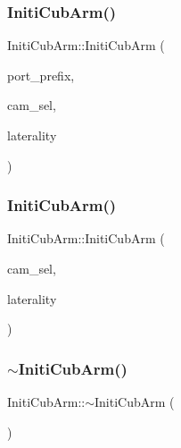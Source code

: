 \subsubsection{\texorpdfstring{Initi\+Cub\+Arm()}{InitiCubArm()}\hspace{0.1cm}{\footnotesize\ttfamily [1/2]}}
{\footnotesize\ttfamily Initi\+Cub\+Arm\+::\+Initi\+Cub\+Arm (\begin{DoxyParamCaption}\item[{const yarp\+::os\+::\+Const\+String \&}]{port\+\_\+prefix,  }\item[{const yarp\+::os\+::\+Const\+String \&}]{cam\+\_\+sel,  }\item[{const yarp\+::os\+::\+Const\+String \&}]{laterality }\end{DoxyParamCaption})\hspace{0.3cm}{\ttfamily [noexcept]}}

\mbox{\label{classInitiCubArm_affa3e5d97a2f24f3e3fd2030a0dd5dbc}} 
\subsubsection{\texorpdfstring{Initi\+Cub\+Arm()}{InitiCubArm()}\hspace{0.1cm}{\footnotesize\ttfamily [2/2]}}
{\footnotesize\ttfamily Initi\+Cub\+Arm\+::\+Initi\+Cub\+Arm (\begin{DoxyParamCaption}\item[{const yarp\+::os\+::\+Const\+String \&}]{cam\+\_\+sel,  }\item[{const yarp\+::os\+::\+Const\+String \&}]{laterality }\end{DoxyParamCaption})\hspace{0.3cm}{\ttfamily [noexcept]}}

\mbox{\label{classInitiCubArm_a337d96e7aecbd9235b3734c2aa317429}} 
\subsubsection{\texorpdfstring{$\sim$\+Initi\+Cub\+Arm()}{~InitiCubArm()}}
{\footnotesize\ttfamily Initi\+Cub\+Arm\+::$\sim$\+Initi\+Cub\+Arm (\begin{DoxyParamCaption}{ }\end{DoxyParamCaption})\hspace{0.3cm}{\ttfamily [noexcept]}}



